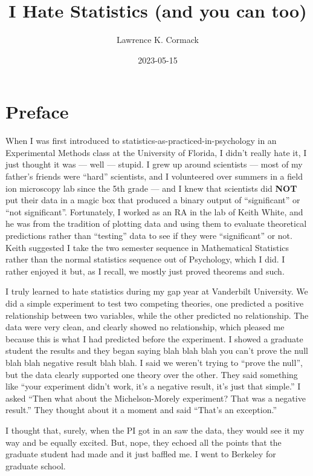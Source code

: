 \documentclass[
]{book}
\title{I Hate Statistics (and you can too)}
\author{Lawrence K. Cormack}
\date{2023-05-15}
\begin{document}
\maketitle

{
\setcounter{tocdepth}{1}
\tableofcontents
}
\hypertarget{preface}{%
\chapter*{Preface}\label{preface}}

When I was first introduced to statistics-as-practiced-in-psychology in an Experimental Methods class at the University of Florida, I didn't really hate it, I just thought it was --- well --- stupid. I grew up around scientists --- most of my father's friends were ``hard'' scientists, and I volunteered over summers in a field ion microscopy lab since the 5th grade --- and I knew that scientists did \textbf{NOT} put their data in a magic box that produced a binary output of ``significant'' or ``not significant''. Fortunately, I worked as an RA in the lab of Keith White, and he was from the tradition of plotting data and using them to evaluate theoretical predictions rather than ``testing'' data to see if they were ``significant'' or not. Keith suggested I take the two semester sequence in Mathematical Statistics rather than the normal statistics sequence out of Psychology, which I did. I rather enjoyed it but, as I recall, we mostly just proved theorems and such.

I truly learned to hate statistics during my gap year at Vanderbilt University. We did a simple experiment to test two competing theories, one predicted a positive relationship between two variables, while the other predicted no relationship. The data were very clean, and clearly showed no relationship, which pleased me because this is what I had predicted before the experiment. I showed a graduate student the results and they began saying blah blah blah you can't prove the null blah blah negative result blah blah. I said we weren't trying to ``prove the null'', but the data clearly supported one theory over the other. They said something like ``your experiment didn't work, it's a negative result, it's just that simple.'' I asked ``Then what about the Michelson-Morely experiment? That was a negative result.'' They thought about it a moment and said ``That's an exception.''

I thought that, surely, when the PI got in an saw the data, they would see it my way and be equally excited. But, nope, they echoed all the points that the graduate student had made and it just baffled me. I went to Berkeley for graduate school.
\end{document}
